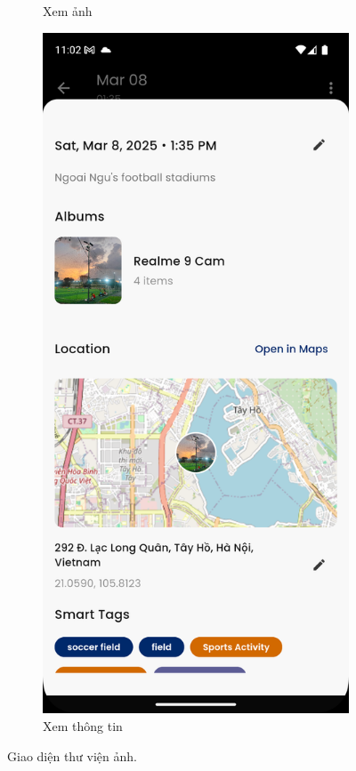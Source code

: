 \begin{figure}[H]
\begin{subfigure}{0.32\textwidth}
        \caption{Xem ảnh}
    \end{subfigure}
    \hfill
    \begin{subfigure}{0.32\textwidth}
        \includegraphics[width=1\linewidth]{figures/c4/4-2/image_info.png} 
        \caption{Xem thông tin }
    \end{subfigure}
    \caption{Giao diện thư viện ảnh.}
    \label{fig:gallery}
\end{figure}

